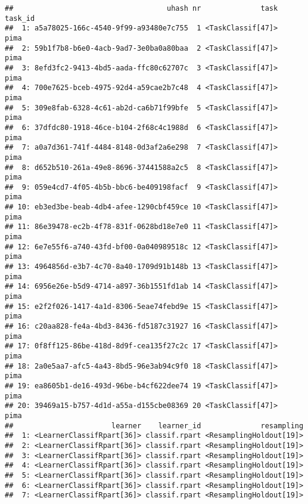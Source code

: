 \documentclass[
]{scrbook}
\newenvironment{Shaded}{\begin{snugshade}}{\end{snugshade}}
\newcommand{\FunctionTok}[1]{\textcolor[rgb]{0.00,0.00,0.00}{#1}}
\newcommand{\NormalTok}[1]{#1}
\newcommand{\SpecialCharTok}[1]{\textcolor[rgb]{0.00,0.00,0.00}{#1}}
\newcommand{\StringTok}[1]{\textcolor[rgb]{0.31,0.60,0.02}{#1}}
\renewenvironment{Shaded} {\begin{snugshade}\small} {\end{snugshade}}
\begin{document}
\begin{Shaded}
\end{Shaded}

\begin{verbatim}
##                                    uhash nr              task task_id
##  1: a5a78025-166c-4540-9f99-a93480e7c755  1 <TaskClassif[47]>    pima
##  2: 59b1f7b8-b6e0-4acb-9ad7-3e0ba0a80baa  2 <TaskClassif[47]>    pima
##  3: 8efd3fc2-9413-4bd5-aada-ffc80c62707c  3 <TaskClassif[47]>    pima
##  4: 700e7625-bceb-4975-92d4-a59cae2b7c48  4 <TaskClassif[47]>    pima
##  5: 309e8fab-6328-4c61-ab2d-ca6b71f99bfe  5 <TaskClassif[47]>    pima
##  6: 37dfdc80-1918-46ce-b104-2f68c4c1988d  6 <TaskClassif[47]>    pima
##  7: a0a7d361-741f-4484-8148-0d3af2a6e298  7 <TaskClassif[47]>    pima
##  8: d652b510-261a-49e8-8696-37441588a2c5  8 <TaskClassif[47]>    pima
##  9: 059e4cd7-4f05-4b5b-bbc6-be409198facf  9 <TaskClassif[47]>    pima
## 10: eb3ed3be-beab-4db4-afee-1290cbf459ce 10 <TaskClassif[47]>    pima
## 11: 86e39478-ec2b-4f78-831f-0628bd18e7e0 11 <TaskClassif[47]>    pima
## 12: 6e7e55f6-a740-43fd-bf00-0a040989518c 12 <TaskClassif[47]>    pima
## 13: 4964856d-e3b7-4c70-8a40-1709d91b148b 13 <TaskClassif[47]>    pima
## 14: 6956e26e-b5d9-4714-a897-36b1551fd1ab 14 <TaskClassif[47]>    pima
## 15: e2f2f026-1417-4a1d-8306-5eae74febd9e 15 <TaskClassif[47]>    pima
## 16: c20aa828-fe4a-4bd3-8436-fd5187c31927 16 <TaskClassif[47]>    pima
## 17: 0f8ff125-86be-418d-8d9f-cea135f27c2c 17 <TaskClassif[47]>    pima
## 18: 2a0e5aa7-afc5-4a43-8bd5-96e3ab94c9f0 18 <TaskClassif[47]>    pima
## 19: ea8605b1-de16-493d-96be-b4cf622dee74 19 <TaskClassif[47]>    pima
## 20: 39469a15-b757-4d1d-a55a-d155cbe08369 20 <TaskClassif[47]>    pima
##                       learner    learner_id              resampling
##  1: <LearnerClassifRpart[36]> classif.rpart <ResamplingHoldout[19]>
##  2: <LearnerClassifRpart[36]> classif.rpart <ResamplingHoldout[19]>
##  3: <LearnerClassifRpart[36]> classif.rpart <ResamplingHoldout[19]>
##  4: <LearnerClassifRpart[36]> classif.rpart <ResamplingHoldout[19]>
##  5: <LearnerClassifRpart[36]> classif.rpart <ResamplingHoldout[19]>
##  6: <LearnerClassifRpart[36]> classif.rpart <ResamplingHoldout[19]>
##  7: <LearnerClassifRpart[36]> classif.rpart <ResamplingHoldout[19]>

\end{verbatim}
\end{document}
